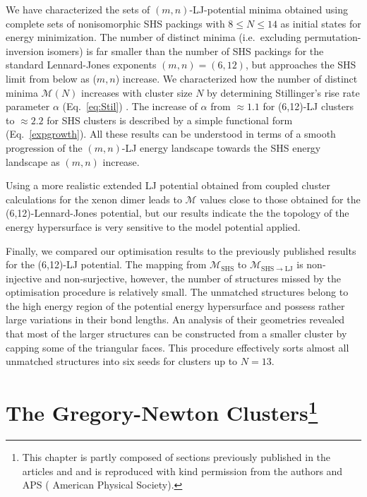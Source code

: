 We have characterized the sets of $(m,n)$-LJ-potential minima obtained using
complete sets of nonisomorphic \ac{SHS} packings with $8 \leq N \leq 14$
\autocite{Arkus_Minimalenergyclusters_2009,Arkus_DerivingFiniteSphere_2011,Hoy_Structurefinitesphere_2012,Hoy_Structuredynamicsmodel_2015,Holmes-Cerfon_EnumeratingRigidSphere_2016}
as initial states for energy minimization.  The number of distinct minima
(i.e.~excluding permutation-inversion isomers) is far smaller than the number
of \ac{SHS} packings for the standard Lennard-Jones exponents $(m,n) = (6,12)$, but
approaches the \ac{SHS} limit from below as ($m,n$) increase.  We characterized how
the number of distinct minima $\mathcal{M}(N)$ increases with cluster size $N$
by determining Stillinger's rise rate parameter $\alpha$ (Eq.\ \ref{eq:Stil})
\autocite{Stillinger_Exponentialmultiplicityinherent_1999}.  The increase of
$\alpha$ from $\approx 1.1$ for (6,12)-LJ clusters to $\approx 2.2$ for \ac{SHS}
clusters is described by a simple functional form (Eq.\ \ref{expgrowth}).  All
these results  can be understood in terms of a smooth progression of the
$(m,n)$-LJ energy landscape towards the \ac{SHS} energy landscape as $(m,n)$
increase.

Using a more realistic extended LJ potential obtained from coupled cluster
calculations for the xenon dimer
\autocite{Schwerdtfeger_ExtensionLennardJonespotential_2006,Jerabek_relativisticcoupledclusterinteraction_2017}
leads to $\mathcal{M}$ values close to those obtained for the
(6,12)-Lennard-Jones potential, but our results indicate the the topology of
the energy hypersurface is very sensitive to the model potential applied.  

Finally, we compared our optimisation results to the previously published
results for the (6,12)-LJ potential. The mapping from $\mathcal{M}_\text{SHS}$
to $\mathcal{M}_\mathrm{SHS\to LJ}$ is non-injective and non-surjective,
however, the number of structures missed by the optimisation procedure is
relatively small. The unmatched structures belong to the high energy region of
the potential energy hypersurface and possess rather large variations in their
bond lengths. An analysis of their geometries revealed that most of the larger
structures can be constructed from a smaller cluster by capping some of the
triangular faces. This procedure effectively sorts almost all unmatched
structures into six seeds for clusters up to $N=13$.


\chapter[The Gregory-Newton Clusters]{
    The Gregory-Newton Clusters\footnote{This chapter is partly composed of
    sections previously published in the articles
    \autocite{Trombach_stickyhardsphereLennardJonestypeclusters_2018}
    and
    \autocite{Trombach_GregoryNewtonProblem13_2018}
    and is reproduced with kind permission from the authors and APS
    ( American Physical Society).}
}
\label{sec:thegregorynewtonclusters}

